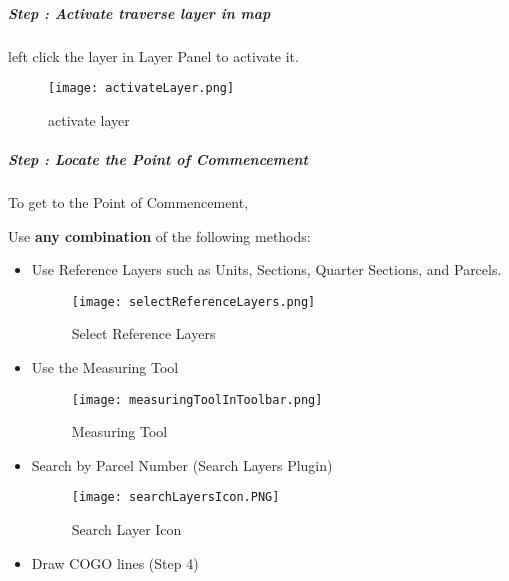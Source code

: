 
\subparagraph*{{\LARGE Step \thestepCount:} Activate traverse layer in map}
\vspace{.2in}

\vspace{.2in}

 left click the layer \textbf {} in Layer Panel to activate it.
\vspace{.2in}

\begin{figure}[H] %
\centering
    \texttt{[image: activateLayer.png]}
\vspace{-.1in}

\caption{activate layer}
\end{figure}

\clearpage


\subparagraph*{{\LARGE Step \thestepCount:} Locate the Point of Commencement}
\vspace{.2in}

\noindent To get to the Point of Commencement,
\vspace{.2in}

\noindent Use \textbf{any combination} of the following methods:
\vspace{.2in}

\begin{itemize}
\item{Use Reference Layers such as Units, Sections, Quarter Sections, and Parcels.

  \begin{figure}[H]
  \centering
  \texttt{[image: selectReferenceLayers.png]}
  \vspace{-.1in}

  \caption{Select Reference Layers}
  \end{figure}
}
\item{Use the Measuring Tool

  \begin{figure}[H]
  \centering
      \texttt{[image: measuringToolInToolbar.png]}
  \vspace{-.2in}

  \caption{Measuring Tool}
  \end{figure}
}
\vspace{.3in}

\item{Search by Parcel Number \small(Search Layers Plugin)\\
\begin{figure}[H]
\centering
    \texttt{[image: searchLayersIcon.PNG]}
\caption{Search Layer Icon}
\end{figure}
}
\item{Draw COGO lines \small(Step 4)}
\end{itemize}
\clearpage

